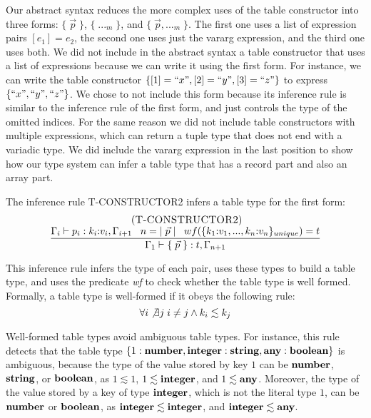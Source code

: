 Our abstract syntax reduces the more complex uses of the table
constructor into three forms: $\{\;\vec{p}\;\}$, $\{\;{...}_{m}\;\}$,
and $\{\;\vec{p},{...}_{m}\;\}$.
The first one uses a list of expression pairs $[e_{1}] = e_{2}$,
the second one uses just the vararg expression, and the third one uses both.
We did not include in the abstract syntax a table constructor
that uses a list of expressions because we can write it using the first form.
For instance, we can write the table constructor
$\{ [1] = ``x", [2] = ``y", [3] = ``z" \}$ to express $\{ ``x", ``y", ``z" \}$.
We chose to not include this form because its inference rule is similar
to the inference rule of the first form, and just controls the type of
the omitted indices.
For the same reason we did not include table constructors with
multiple expressions, which can return a tuple type that does not end
with a variadic type.
We did include the vararg expression in the last position to show how
our type system can infer a table type that has a record part and
also an array part.

The inference rule \textsc{T-CONSTRUCTOR2} infers a table type for
the first form:
\[
\begin{array}{c}
\; (\textsc{T-CONSTRUCTOR2})\\
\dfrac{\Gamma_{i} \vdash p_{i}:k_{i}{:}v_{i}, \Gamma_{i+1} \;\;\;
       n = |\;\vec{p}\;| \;\;\;
       wf(\{k_{1}{:}v_{1}, ..., k_{n}{:}v_{n}\}_{unique}) = t}
      {\Gamma_{1} \vdash \{\;\vec{p}\;\}:t, \Gamma_{n+1}}
\end{array}
\]

This inference rule infers the type of each pair, uses these types
to build a table type, and uses the predicate \emph{wf} to check
whether the table type is well formed.
Formally, a table type is well-formed if it obeys the following rule:
\[
\forall i \not\exists j \; i \not= j \wedge k_{i} \lesssim k_{j}
\]

Well-formed table types avoid ambiguous table types.
For instance, this rule detects that the table type
$\{1:\mathbf{number}, \mathbf{integer}:\mathbf{string}, \mathbf{any}:\mathbf{boolean}\}$ is ambiguous,
because the type of the value stored by key $1$ can be
$\mathbf{number}$, $\mathbf{string}$, or $\mathbf{boolean}$, as $1 \lesssim 1$,
$1 \lesssim \mathbf{integer}$, and $1 \lesssim \mathbf{any}$.
Moreover, the type of the value stored by a key of type $\mathbf{integer}$,
which is not the literal type $1$, can be $\mathbf{number}$ or $\mathbf{boolean}$,
as $\mathbf{integer} \lesssim \mathbf{integer}$, and $\mathbf{integer} \lesssim \mathbf{any}$.


